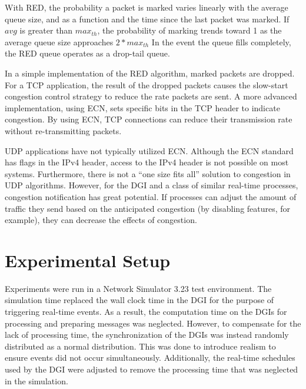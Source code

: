 With \ac{RED}, the probability a packet is marked varies linearly with the average queue size, and as a function and the time since the last packet was marked.
If $avg$ is greater than $max_{th}$, the probability of marking trends toward 1 as the average queue size approaches $2*max_{th}$
In the event the queue fills completely, the \ac{RED} queue operates as a drop-tail queue.

In a simple implementation of the \ac{RED} algorithm, marked packets are dropped.
For a TCP application, the result of the dropped packets causes the slow-start congestion control strategy to reduce the rate packets are sent.
A more advanced implementation, using \ac{ECN}, sets specific bits in the TCP header to indicate congestion.
By using \ac{ECN}, TCP connections can reduce their transmission rate without re-transmitting packets.

UDP applications have not typically utilized \ac{ECN}.
Although the \ac{ECN} standard has flags in the IPv4 header, access to the IPv4 header is not possible on most systems.
Furthermore, there is not a ``one size fits all'' solution to congestion in UDP algorithms.
However, for the \ac{DGI} and a class of similar real-time processes, congestion notification has great potential.
If processes can adjust the amount of traffic they send based on the anticipated congestion (by disabling features, for example), they can decrease the effects of congestion.

\section{Experimental Setup}
\label{sect:experimentalsetup}

Experiments were run in a Network Simulator 3.23\cite{NS3} test environment.
The simulation time replaced the wall clock time in the \ac{DGI} for the purpose of triggering real-time events.
As a result, the computation time on the \ac{DGI}s for processing and preparing messages was neglected.
However, to compensate for the lack of processing time, the synchronization of the \ac{DGI}s was instead randomly distributed as a normal distribution.
This was done to introduce realism to ensure events did not occur simultaneously.
Additionally, the real-time schedules used by the \ac{DGI} were adjusted to remove the processing time that was neglected in the simulation.

